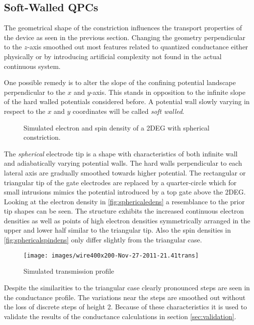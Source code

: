\subsection{Soft-Walled QPCs}
The geometrical shape of the constriction influences the transport properties of the device as seen in the previous section. Changing the geometry perpendicular to the $z$-axis smoothed out most features related to quantized conductance either physically or by introducing artificial complexity not found in the actual continuous system.\par
One possible remedy is to alter the slope of the confining potential landscape perpendicular to the $x$ and $y$-axis. This stands in opposition to the infinite slope of the hard walled potentials considered before. A potential wall slowly varying in respect to the $x$ and $y$ coordinates will be called \emph{soft walled}.\par
\begin{figure}[h]
\caption{Simulated electron and spin density of a 2DEG with spherical constriction.}
\end{figure}
The \emph{spherical} electrode tip is a shape with characteristics of both infinite wall and adiabatically varying potential walls. The hard walls perpendicular to each lateral axis are gradually smoothed towards higher potential. The rectangular or triangular tip of the gate electrodes are replaced by a quarter-circle which for small intrusions mimics the potential introduced by a top gate above the 2DEG. Looking at the electron density in \cref{fig:sphericaledens} a resemblance to the prior tip shapes can be seen. The structure exhibits the increased continuous electron densities as well as points of high electron densities symmetrically arranged in the upper and lower half similar to the triangular tip. Also the spin densities in \cref{fig:sphericalspindens} only differ slightly from the triangular case.\par
\begin{figure}[h]
\centering
\texttt{[image: images/wire400x200-Nov-27-2011-21.41trans]}
\caption{Simulated transmission profile}
\end{figure}
Despite the similarities to the triangular case clearly pronounced steps are seen in the conductance profile. The variations near the steps are smoothed out without the loss of discrete steps of height 2. Because of these characteristics it is used to validate the results of the conductance calculations in section \ref{sec:validation}.\par
